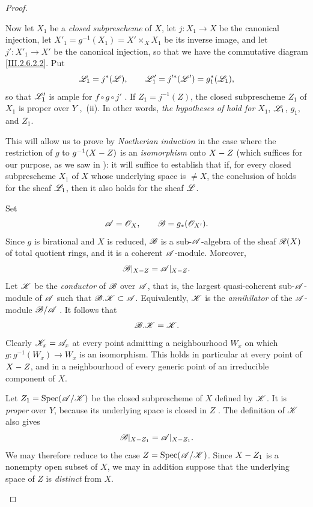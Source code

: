 \begin{proof}
\begin{env}[2.6.2.3]
\label{III.2.6.2.3}
Now let $X_1$ be a \emph{closed subprescheme} of $X$, let $j:X_1\to X$ be the
canonical injection, let $X'_1=g^{-1}(X_1)=X'\times_X X_1$ be its inverse image,
and let $j':X'_1\to X'$ be the canonical injection, so that we have the
commutative diagram \eqref{III.2.6.2.2}.
Put
\[
  \mathscr{L}_1=j^*(\mathscr{L}),
  \qquad
  \mathscr{L}'_1=j'^*(\mathscr{L}')=g_1^*(\mathscr{L}_1),
\]
so that $\mathscr{L}'_1$ is ample for $f\circ g\circ j'$
.
If $Z_1=j^{-1}(Z)$, the closed subprescheme $Z_1$ of $X_1$ is proper
over $Y$ ,~(ii).
In other words, \emph{the hypotheses of}  \emph{hold for}
$X_1$, $\mathscr{L}_1$, $g_1$, and $Z_1$.
\end{env}


This will allow us to prove  by \emph{Noetherian induction}
 in the case where the restriction of $g$ to $g^{-1}(X- Z)$ is an
\emph{isomorphism} onto $X- Z$ (which suffices for our purpose, as we saw in
): it will suffice to establish that if, for every closed
subprescheme $X_1$ of $X$ whose underlying space is $\neq X$, the conclusion
of  holds for the sheaf $\mathscr{L}_1$, then it also holds for
the sheaf $\mathscr{L}$.

\begin{env}[2.6.2.4]
\label{III.2.6.2.4}
Set
\[
  \mathscr{A}=\mathscr{O}_X,
  \qquad
  \mathscr{B}=g_*(\mathscr{O}_{X'}).
\]
Since $g$ is birational and $X$ is reduced, $\mathscr{B}$ is a
sub-$\mathscr{A}$-algebra of the sheaf $\mathscr{R}(X)$ of total quotient rings,
and it is a coherent $\mathscr{A}$-module.
Moreover,
\[
  \mathscr{B}|_{X-Z}=\mathscr{A}|_{X-Z}.
\]
Let $\mathscr{K}$ be the \emph{conductor} of $\mathscr{B}$ over $\mathscr{A}$, that is, the
largest quasi-coherent sub-$\mathscr{A}$-module of $\mathscr{A}$ such that $\mathscr{B}.\mathscr{K}\subset\mathscr{A}$.
Equivalently, $\mathscr{K}$ is the \emph{annihilator} of the
$\mathscr{A}$-module $\mathscr{B}/\mathscr{A}$ .
It follows that
\[
  \mathscr{B}.\mathscr{K}=\mathscr{K}.
\]
Clearly $\mathscr{K}_x=\mathscr{A}_x$ at every point admitting a neighbourhood
$W_x$ on which $g:g^{-1}(W_x)\to W_x$ is an isomorphism.
This holds in particular at every point of $X- Z$, and in a
neighbourhood of every generic point of an irreducible component of
$X$.

Let $Z_1=\operatorname{Spec}(\mathscr{A}/\mathscr{K})$
be the closed subprescheme of $X$ defined by $\mathscr{K}$.
It is \emph{proper} over $Y$, because its underlying space is closed in $Z$
.
The definition of $\mathscr{K}$ also gives
\[
  \mathscr{B}|_{X- Z_1}=\mathscr{A}|_{X- Z_1}.
\]
We may therefore reduce to the case $Z=\operatorname{Spec}(\mathscr{A}/\mathscr{K})$.
Since $X- Z_1$ is a nonempty open subset of $X$, we may in addition
suppose that the underlying space of $Z$ is \emph{distinct} from $X$.
\end{env}


\end{proof}
